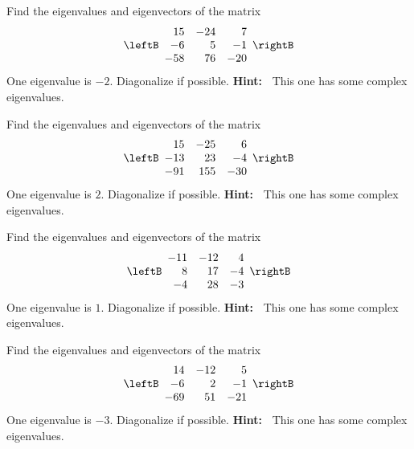 \begin{enumialphparenastyle}

\begin{ex} Find the eigenvalues and eigenvectors of the matrix
\begin{equation*}
\leftB
\begin{array}{rrr}
15 & -24 & 7 \\
-6 & 5 & -1 \\
-58 & 76 & -20
\end{array}
\rightB
\end{equation*}
One eigenvalue is $-2. $ Diagonalize if possible. \textbf{Hint:\ }
This one has some complex eigenvalues.
\end{ex}

\begin{ex} Find the eigenvalues and eigenvectors of the matrix
\begin{equation*}
\leftB
\begin{array}{rrr}
15 & -25 & 6 \\
-13 & 23 & -4 \\
-91 & 155 & -30
\end{array}
\rightB
\end{equation*}
One eigenvalue is $2.$ Diagonalize if possible. \textbf{Hint:\ }
This one has some complex eigenvalues.
\end{ex}

\begin{ex} Find the eigenvalues and eigenvectors of the matrix
\begin{equation*}
\leftB
\begin{array}{rrr}
-11 & -12 & 4 \\
8 & 17 & -4 \\
-4 & 28 & -3
\end{array}
\rightB
\end{equation*}
One eigenvalue is $1.$ Diagonalize if possible. \textbf{Hint:\ }
This one has some complex eigenvalues.
\end{ex}

\begin{ex} Find the eigenvalues and eigenvectors of the matrix
\begin{equation*}
\leftB
\begin{array}{rrr}
14 & -12 & 5 \\
-6 & 2 & -1 \\
-69 & 51 & -21
\end{array}
\rightB
\end{equation*}
One eigenvalue is $-3.$ Diagonalize if possible. \textbf{Hint:\ }
This one has some complex eigenvalues.
\end{ex}


\end{enumialphparenastyle}
